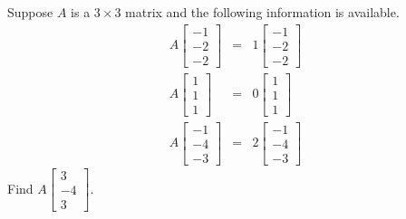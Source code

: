 \documentclass{ximera}
\begin{document}
\begin{problem}\label{prb:8.7} Suppose $A$ is a $3\times 3$ matrix and the following information is
available.
\begin{eqnarray*}
A\left[
\begin{array}{r}
-1 \\
-2 \\
-2
\end{array}
\right] &=&1\left[
\begin{array}{r}
-1 \\
-2 \\
-2
\end{array}
\right] \\
A\left[
\begin{array}{r}
1 \\
1 \\
1
\end{array}
\right] &=& 0\left[
\begin{array}{r}
1 \\
1 \\
1
\end{array}
\right] \\
A\left[
\begin{array}{r}
-1 \\
-4 \\
-3
\end{array}
\right] &=&2\left[
\begin{array}{r}
-1 \\
-4 \\
-3
\end{array}
\right]
\end{eqnarray*}
Find $A\left[
\begin{array}{r}
3 \\
-4 \\
3
\end{array}
\right]. $
\end{problem}
\end{document}
